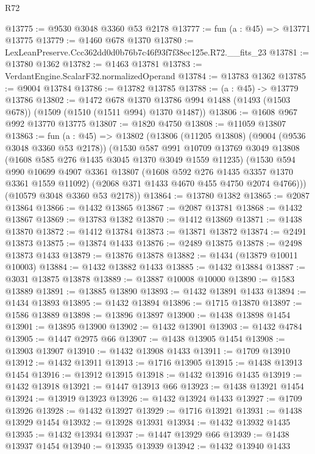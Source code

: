 \begin{lexlean}{R72}
\begin{coremodule}
@13775 := @9530 @3048 @3360 @53 @2178
@13777 := fun (a : @45) => @13771 @13775
@13779 := @1460 @678 @1370
@13780 := LexLeanPreserve.Ccc362dd0d0b76b7c46f93f7f38ec125e.R72.__fits_23
@13781 := @13780 @1362
@13782 := @1463 @13781
@13783 := VerdantEngine.ScalarF32.normalizedOperand
@13784 := @13783 @1362
@13785 := @9004 @13784
@13786 := @13782 @13785
@13788 := (a : @45) -> @13779 @13786
@13802 := @1472
    @678
    @1370
    @13786
    @994
    @1488
    (@1493 (@1503 @678))
    (@1509 (@1510 (@1511 @994) @1370 @1487))
@13806 := @1608 @967 @992 @13770 @13775
@13807 := @1820 @4750
@13808 := @11059 @13807
@13863 := fun (a : @45) =>
  @13802
    (@13806
      (@11205 @13808)
      (@9004 (@9536 @3048 @3360 @53 @2178))
      (@1530
        @587
        @991
        @10709
        @13769
        @3049
        @13808
        (@1608 @585 @276 @1435 @3045 @1370 @3049 @1559 @11235)
        (@1530
          @594
          @990
          @10699
          @4907
          @3361
          @13807
          (@1608 @592 @276 @1435 @3357 @1370 @3361 @1559 @11092)
          (@2068 @371 @1433 @4670 @455 @4750 @2074 @4766)))
      (@10579 @3048 @3360 @53 @2178))
@13864 := @13780 @1382
@13865 := @2087 @13864
@13866 := @1432 @13865
@13867 := @2087 @13781
@13868 := @1432 @13867
@13869 := @13783 @1382
@13870 := @1412 @13869
@13871 := @1438 @13870
@13872 := @1412 @13784
@13873 := @13871 @13872
@13874 := @2491 @13873
@13875 := @13874 @1433
@13876 := @2489 @13875
@13878 := @2498 @13873 @1433
@13879 := @13876 @13878
@13882 := @1434 (@13879 @10011 @10003)
@13884 := @1432 @13882 @1433
@13885 := @1432 @13884
@13887 := @3031 @13875 @13878
@13889 := @13887 @10008 @10000
@13890 := @1583 @13889
@13891 := @13885 @13890
@13893 := @1432 @13891 @1433
@13894 := @1434 @13893
@13895 := @1432 @13894
@13896 := @1715 @13870
@13897 := @1586 @13889
@13898 := @13896 @13897
@13900 := @1438 @13898 @1454
@13901 := @13895 @13900
@13902 := @1432 @13901
@13903 := @1432 @4784
@13905 := @1447 @2975 @66
@13907 := @1438 @13905 @1454
@13908 := @13903 @13907
@13910 := @1432 @13908 @1433
@13911 := @1709 @13910
@13912 := @1432 @13911
@13913 := @1716 @13905
@13915 := @1438 @13913 @1454
@13916 := @13912 @13915
@13918 := @1432 @13916 @1435
@13919 := @1432 @13918
@13921 := @1447 @13913 @66
@13923 := @1438 @13921 @1454
@13924 := @13919 @13923
@13926 := @1432 @13924 @1433
@13927 := @1709 @13926
@13928 := @1432 @13927
@13929 := @1716 @13921
@13931 := @1438 @13929 @1454
@13932 := @13928 @13931
@13934 := @1432 @13932 @1435
@13935 := @1432 @13934
@13937 := @1447 @13929 @66
@13939 := @1438 @13937 @1454
@13940 := @13935 @13939
@13942 := @1432 @13940 @1433

\end{coremodule}
\end{lexlean}
